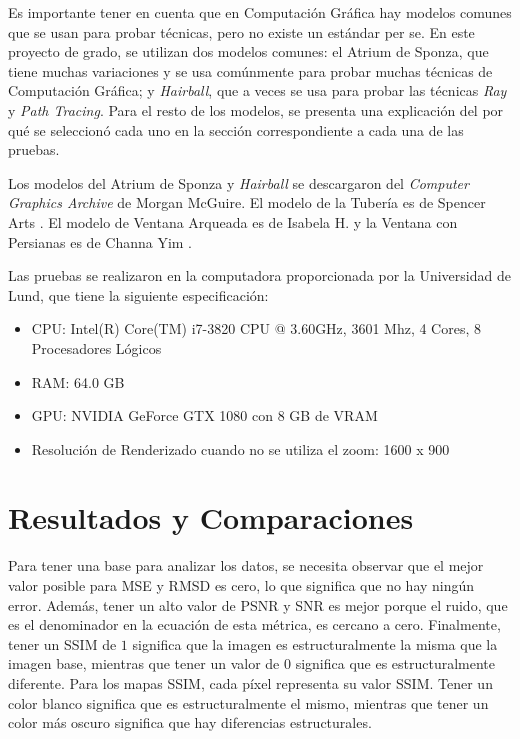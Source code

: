 \documentclass[pregrado]{tesis-usb} %
\begin{document}
Es importante tener en cuenta que en Computación Gráfica hay modelos comunes que se usan para probar técnicas, pero no existe un estándar per se. En este proyecto de grado, se utilizan dos modelos comunes: el Atrium de Sponza, que tiene muchas variaciones y se usa comúnmente para probar muchas técnicas de Computación Gráfica; y \textit{Hairball}, que a veces se usa para probar las técnicas \textit{Ray} y \textit{Path Tracing}. Para el resto de los modelos, se presenta una explicación del por qué se seleccionó cada uno en la sección correspondiente a cada una de las pruebas.

Los modelos del Atrium de Sponza y \textit{Hairball} se descargaron del \textit{Computer Graphics Archive} \cite{McGuire2017Data} de Morgan McGuire. El modelo de la Tubería es de Spencer Arts \cite{Spencer2010}. El modelo de Ventana Arqueada es de Isabela H. \cite{Isabela2016} y la Ventana con Persianas es de Channa Yim \cite{Channa2015}.

Las pruebas se realizaron en la computadora proporcionada por la Universidad de Lund, que tiene la siguiente especificación:
\begin{itemize}
\setlength\itemsep{0em}
\item CPU: Intel(R) Core(TM) i7-3820 CPU @ 3.60GHz, 3601 Mhz, 4 Cores, 8 Procesadores Lógicos
\item RAM: 64.0 GB	
\item GPU: NVIDIA GeForce GTX 1080 con 8 GB de VRAM
\item Resolución de Renderizado cuando no se utiliza el zoom: 1600 x 900
\end{itemize}

\section{Resultados y Comparaciones}
Para tener una base para analizar los datos, se necesita observar que el mejor valor posible para MSE y RMSD es cero, lo que significa que no hay ningún error. Además, tener un alto valor de PSNR y SNR es mejor porque el ruido, que es el denominador en la ecuación de esta métrica, es cercano a cero. Finalmente, tener un SSIM de $1$ significa que la imagen es estructuralmente la misma que la imagen base, mientras que tener un valor de $0$ significa que es estructuralmente diferente. Para los mapas SSIM, cada píxel representa su valor SSIM. Tener un color blanco significa que es estructuralmente el mismo, mientras que tener un color más oscuro significa que hay diferencias estructurales.
\end{document}
